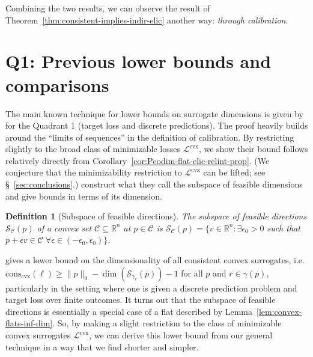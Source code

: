 \documentclass[11pt]{article} %
\newcommand{\Comments}{1}
\newcommand{\mynote}[2]{\ifnum\Comments=1\textcolor{#1}{#2}\fi}
\newcommand{\mytodo}[2]{\ifnum\Comments=1%
	\todo[linecolor=#1!80!black,backgroundcolor=#1,bordercolor=#1!80!black]{#2}\fi}
\newcommand{\jessiet}[1]{\mytodo{purple!20!white}{JF: #1}}
\newcommand{\bo}[1]{\mynote{blue}{[Bo: #1]}}
\newcommand{\reals}{\mathbb{R}}
\newcommand{\conscvx}{\mathrm{cons}_\mathrm{cvx}}
\newcommand{\C}{\mathcal{C}}
\newcommand{\Lcvx}{\mathcal{L}^{\mathrm{cvx}}}
\newcommand{\Sc}{\mathcal{S}}  %
\newtheorem{definition}{Definition}
\begin{document}
Combining the two results, we can observe the result of Theorem~\ref{thm:consistent-implies-indir-elic} another way: \emph{through calibration}.

\section{Q1: Previous lower bounds and comparisons}\label{sec:finite-calib}

The main known technique for lower bounds on surrogate dimensions is given by \citet{ramaswamy2016convex} for the Quadrant 1 (target loss and discrete predictions).
The proof heavily builds around the ``limits of sequences'' in the definition of calibration.
By restricting slightly to the broad class of minimizable losses $\Lcvx$, we show their bound follows relatively directly from Corollary~\ref{cor:Pcodim-flat-elic-relint-prop}.
(We conjecture that the minimizability restriction to $\Lcvx$ can be lifted; see \S~\ref{sec:conclusions}.)
\citet{ramaswamy2016convex} construct what they call the subspace of feasible dimensions and give bounds in terms of its dimension.
\begin{definition}[Subspace of feasible directions]\label{def:subspace-feas}
	The \emph{subspace of feasible directions} $\Sc_\C(p)$ of a convex set $\C \subseteq \reals^n$ at $p \in \C$ is $\Sc_\C(p) = \{ v \in \reals^n : \exists \epsilon_0 > 0 $ such that $p + \epsilon v \in \C \; \forall \epsilon \in (-\epsilon_0,\epsilon_0) \}$.
\end{definition}

\citet{ramaswamy2016convex} gives a lower bound on the dimensionality of all consistent convex surrogates, i.e. $\conscvx(\ell) \geq \|p\|_0 - \dim(\Sc_{\gamma_r}(p)) - 1$ for all $p$ and $r \in \gamma(p)$, particularly in the setting where one is given a discrete prediction problem and target loss over finite outcomes.
It turns out that the subspace of feasible directions is essentially a special case of a flat described by Lemma~\ref{lem:convex-flats-inf-dim}.
So, by making a slight restriction to the class of minimizable convex surrogates $\Lcvx$, we can derive this lower bound from our general technique in a way that we find shorter and simpler.
\end{document}
